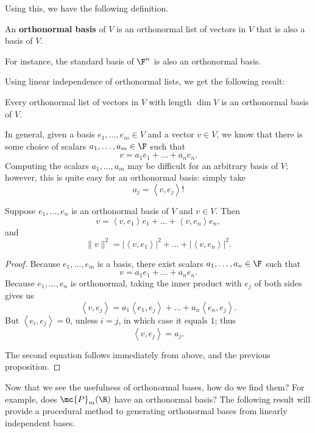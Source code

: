 \documentclass[math0540-lecture-notes.tex]{subfiles}
\begin{document}
Using this, we have the following definition.
\begin{definition}{}
  An \textbf{orthonormal basis} of $V$ is an orthonormal list of vectors in $V$ that is also a basis
  of $V$.
\end{definition}
For instance, the standard basis of $\F^{n}$ is also an orthonormal basis.

Using linear independence of orthonormal lists, we get the following result:
\begin{proposition}{}
  Every orthonormal list of vectors in $V$ with length $\dim{V}$ is an orthonormal basis of $V$.
\end{proposition}

In general, given a basis $e_1,\ldots,e_m\in V$ and a vector $v\in V$, we know that there is some
choice of scalars $a_1,\ldots,a_m\in \F$ such that \[
  v=a_1e_1+\ldots+a_ne_n
.\] Computing the scalars $a_1,\ldots,a_m$ may be difficult for an arbitrary basis of $V$; however,
this is quite easy for an orthonormal basis: simply take \[
  a_j=\left<v,e_j \right>
!\] 

\begin{proposition}{}
  Suppose $e_1,\ldots,e_n$ is an orthonormal basis of $V$ and $v\in V$. Then \[
    v=\left<v,e_1 \right>e_1+\ldots+\left<v,e_n \right>e_n
  ,\] and \[
    \|v\|^2=\left| \left<v,e_1 \right> \right| ^2+\ldots+\left| \left<v,e_n \right> \right| ^2
  .\] 
\end{proposition}
\begin{proof}[Proof]
  Because $e_1,\ldots,e_m$ is a basis, there exist scalars $a_1,\ldots,a_n\in \F$ such that \[
    v=a_1e_1+\ldots+a_ne_n
  .\] Because $e_1,\ldots,e_n$ is orthonormal, taking the inner product with $e_j$ of both sides
  gives us \[
    \left<v,e_j \right> = a_1\left<e_1,e_j \right>+\ldots+a_n\left<e_n,e_j \right>
  .\] But $\left<e_i,e_j \right>=0$, unless $i=j$, in which case it equals $1$; thus \[
    \left<v,e_j \right>=a_j
  .\]

  The second equation follows immediately from above, and the previous proposition.
\end{proof}

Now that we see the usefulness of orthonormal bases, how do we find them? For example, does
$\mc{P}_m(\R)$ have an orthonormal basis? The following result will provide a procedural method to
generating orthonormal bases from linearly independent bases.
\end{document}
